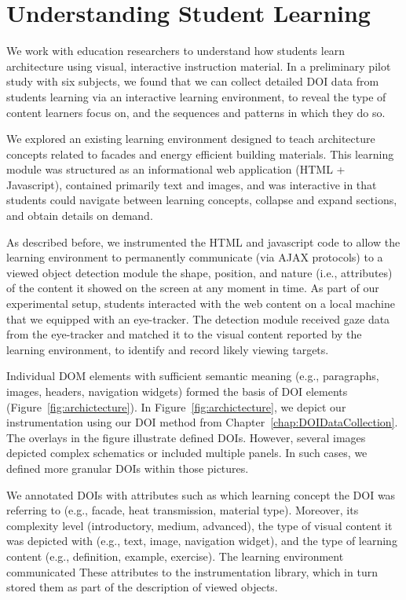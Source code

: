 \section{Understanding Student Learning}
\label{sec:ExperimentArchitecture}
We work with education researchers to understand how students learn architecture using visual, interactive instruction material. In a preliminary pilot study with six subjects, we found that we can collect detailed DOI data from students learning via an interactive learning environment, to reveal the type of content learners focus on, and the sequences and patterns in which they do so. 

We explored an existing learning environment designed to teach architecture concepts related to facades and energy efficient building materials. This learning module was structured as an informational web application (HTML + Javascript), contained primarily text and images, and was interactive in that students could navigate between learning concepts, collapse and expand sections, and obtain details on demand. 

As described before, we instrumented the HTML and javascript code to allow the learning environment to permanently communicate (via AJAX protocols) to a viewed object detection module the shape, position, and nature (i.e., attributes) of the content it showed on the screen at any moment in time. As part of our experimental setup, students interacted with the web content on a local machine that we equipped with an eye-tracker. The detection module received gaze data from the eye-tracker and matched it to the visual content reported by the learning environment, to identify and record likely viewing targets.

Individual DOM elements with sufficient semantic meaning (e.g., paragraphs, images, headers, navigation widgets) formed the basis of DOI elements (Figure~\ref{fig:archictecture}). In Figure~\ref{fig:archictecture}, we depict our instrumentation using our DOI method from Chapter~\ref{chap:DOIDataCollection}. The overlays in the figure illustrate defined DOIs. However, several images depicted complex schematics or included multiple panels. In such cases, we defined more granular DOIs within those pictures. 

We annotated DOIs with attributes such as which learning concept the DOI was referring to (e.g., facade, heat transmission, material type). Moreover, its complexity level (introductory, medium, advanced), the type of visual content it was depicted with (e.g., text, image, navigation widget), and the type of learning content (e.g., definition, example, exercise). The learning environment communicated These attributes to the instrumentation library, which in turn stored them as part of the description of viewed objects.

